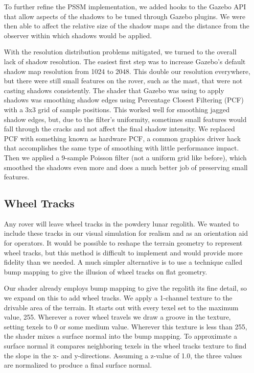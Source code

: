 \documentclass[twocolumn,letterpaper]{IEEEAerospaceCLS}  %
\begin{document}
To further refine the PSSM implementation, we added hooks to the Gazebo API that allow aspects of the shadows to be tuned through Gazebo plugins. 
We were then able to affect the relative size of the shadow maps and the distance from the observer within which shadows would be applied.

With the resolution distribution problems mitigated, we turned to the overall lack of shadow resolution. 
The easiest first step was to increase Gazebo's default shadow map resolution from 1024 to 2048. 
This double our resolution everywhere, but there were still small features on the rover, such as the mast, that were not casting shadows consistently. 
The shader that Gazebo was using to apply shadows was smoothing shadow edges using Percentage Closest Filtering (PCF) with a 3x3 grid of sample positions. 
This worked well for smoothing jagged shadow edges, but, due to the filter's uniformity, sometimes small features would fall through the cracks and not affect the final shadow intensity. 
We replaced PCF with something known as hardware PCF, a common graphics driver hack that accomplishes the same type of smoothing with little performance impact. 
Then we applied a 9-sample Poisson filter (not a uniform grid like before), which smoothed the shadows even more and does a much better job of preserving small features.

\subsection{Wheel Tracks}
Any rover will leave wheel tracks in the powdery lunar regolith. We wanted to include these tracks in our visual simulation for realism and as an orientation aid for operators. 
It would be possible to reshape the terrain geometry to represent wheel tracks, but this method is difficult to implement and would provide more fidelity than we needed.
A much simpler alternative is to use a technique called bump mapping to give the illusion of wheel tracks on flat geometry.

Our shader already employs bump mapping to give the regolith its fine detail, so we expand on this to add wheel tracks. 
We apply a 1-channel texture to the drivable area of the terrain.
It starts out with every texel set to the maximum value, 255. 
Wherever a rover wheel travels we draw a groove in the texture, setting texels to 0 or some medium value.
Wherever this texture is less than 255, the shader mixes a surface normal into the bump mapping. 
To approximate a surface normal it compares neighboring texels in the wheel tracks texture to find the slope in the x- and y-directions. 
Assuming a z-value of 1.0, the three values are normalized to produce a final surface normal.
\end{document}
